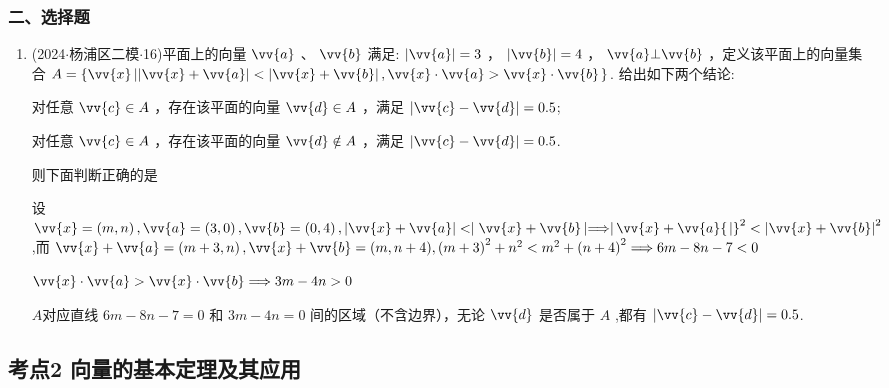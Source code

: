 \subsubsection*{二、选择题}
\begin{enumerate}
    \item (2024$\cdot$杨浦区二模$\cdot$16)平面上的向量 $\vv{a}$ 、 $\vv{b}$ 满足: $\left| \vv{a}\right|  = 3$ ， $\left| \vv{b}\right|  = 4$ ， $\vv{a}\bot \vv{b}$ ，定义该平面上的向量集合 $A = \left\{ \vv{x}\left| \left|  \vv{x} + \vv{a}\right|  < \left|\vv{x} + \vv{b} \right| ,\vv{x} \cdot  \vv{a} > \vv{x} \cdot  \vv{b}\right. \right\}$. 给出如下两个结论:

      对任意 $\vv{c} \in  A$ ，存在该平面的向量 $\vv{d} \in  A$ ，满足 $\left| {\vv{c} - \vv{d}}\right|  = 0.5$;

      对任意 $\vv{c} \in  A$ ，存在该平面的向量 $\vv{d} \notin  A$ ，满足 $\left| {\vv{c} - \vv{d}}\right|  = 0.5$.

    则下面判断正确的是 
    \begin{jieda}
        设 $\vv{x} = \left( {m,n}\right) ,\vv{a} = \left( {3,0}\right) ,\vv{b} = \left( {0,4}\right) ,\left| {\vv{x} + \vv{a}}\right|  <  \mid  \vv{x} +  \vv{b}\left|  \Longrightarrow  \right| \vv{x} + \vv{a}{\left. \right| }^{2} < {\left| \vv{x} + \vv{b}\right| }^{2}$ ,而 $\vv{x} + \vv{a} = \left( {m + 3,n}\right) ,\vv{x} + \vv{b} = (m, n + 4),{\left( m + 3\right) }^{2} + {n}^{2} < {m}^{2} + {\left( n + 4\right) }^{2} \Longrightarrow  {6m} - {8n} - 7 < 0$  
        
        $\vv{x} \cdot  \vv{a} > \vv{x} \cdot  \vv{b} \Longrightarrow  {3m} - {4n} > 0$
        
        $A$对应直线 ${6m} - {8n} - 7 = 0$ 和 ${3m} -  {4n} = 0$ 间的区域（不含边界），无论 $\vv{d}$ 是否属于 $A$ ,都有 $\left| {\vv{c} - \vv{d}}\right|  = 0.5$.
    \end{jieda}
\end{enumerate}
\subsection*{考点2 向量的基本定理及其应用}

